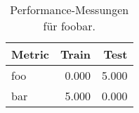 \begin{table}[ht]
  \centering
  \caption{Performance-Messungen für foobar.}
  \label{tab:foobar-performance}
  \begin{tabular}{lrr}
    \toprule
    Metric & Train&Test\\
    \midrule
      foo & 0.000 & 5.000  \\
      bar & 5.000 & 0.000  \\
    \bottomrule
  \end{tabular}
\end{table}
